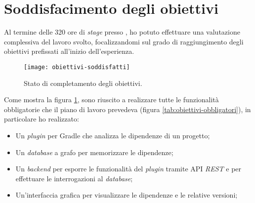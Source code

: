 \section{Soddisfacimento degli obiettivi}
Al termine delle 320 ore di \textit{stage} presso \azienda{}, ho potuto effettuare una valutazione complessiva del lavoro svolto, 
focalizzandomi sul grado di raggiungimento degli obiettivi prefissati all'inizio dell'esperienza.

\begin{figure}[!h] 
  \centering 
  \texttt{[image: obiettivi-soddisfatti]} 
  \caption{Stato di completamento degli obiettivi.}
  \label{fig:obiettivi-soddisfatti}
\end{figure}

Come mostra la figura \ref{fig:obiettivi-soddisfatti}, sono riuscito a realizzare tutte le funzionalità obbligatorie che il piano di lavoro prevedeva (figura \ref{tab:obiettivi-obbligatori}),
in particolare ho realizzato:
\begin{itemize}
 \item Un \textit{plugin} per Gradle che analizza le dipendenze di un progetto;
 \item Un \textit{database} a grafo per memorizzare le dipendenze;
 \item Un \textit{backend} per esporre le funzionalità del \textit{plugin} tramite API \textit{REST} e per effettuare le interrogazioni al \textit{database};
 \item Un'interfaccia grafica per visualizzare le dipendenze e le relative versioni;
\end{itemize}

